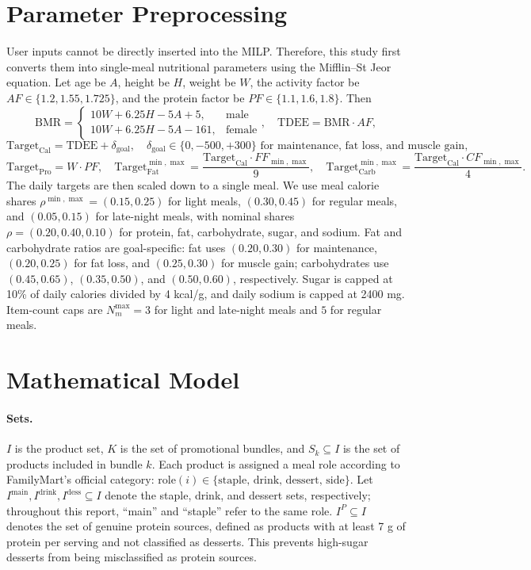 \documentclass[a4paper]{article}
\begin{document}
\section{Parameter Preprocessing}\label{sec:pre}
User inputs cannot be directly inserted into the MILP. Therefore, this study first converts them into single-meal nutritional parameters using the Mifflin--St Jeor equation. Let age be $A$, height be $H$, weight be $W$, the activity factor be $AF \in \{1.2,1.55,1.725\}$, and the protein factor be $PF \in \{1.1,1.6,1.8\}$. Then
\[
\text{BMR} = \begin{cases}10W+6.25H-5A+5, & \text{male}\\10W+6.25H-5A-161, & \text{female}\end{cases},\quad
\text{TDEE} = \text{BMR}\cdot AF,
\]
\[
\text{Target}_{\text{Cal}} = \text{TDEE} + \delta_{\text{goal}}, \quad
\delta_{\text{goal}} \in \{0, -500, +300\} \text{ for maintenance, fat loss, and muscle gain},
\]
\[
\text{Target}_{\text{Pro}} = W \cdot PF, \quad
\text{Target}_{\text{Fat}}^{\min,\max} = \frac{\text{Target}_{\text{Cal}}\cdot FF_{\min,\max}}{9},\quad
\text{Target}_{\text{Carb}}^{\min,\max} = \frac{\text{Target}_{\text{Cal}}\cdot CF_{\min,\max}}{4}.
\]
The daily targets are then scaled down to a single meal. We use meal calorie shares $\rho^{\min,\max}=(0.15,0.25)$ for light meals, $(0.30,0.45)$ for regular meals, and $(0.05,0.15)$ for late-night meals, with nominal shares $\rho=(0.20,0.40,0.10)$ for protein, fat, carbohydrate, sugar, and sodium. Fat and carbohydrate ratios are goal-specific: fat uses $(0.20,0.30)$ for maintenance, $(0.20,0.25)$ for fat loss, and $(0.25,0.30)$ for muscle gain; carbohydrates use $(0.45,0.65)$, $(0.35,0.50)$, and $(0.50,0.60)$, respectively. Sugar is capped at 10\% of daily calories divided by 4 kcal/g, and daily sodium is capped at 2400 mg. Item-count caps are $N_m^{\max}=3$ for light and late-night meals and $5$ for regular meals.

\section{Mathematical Model}\label{sec:model}
\paragraph{Sets.}$I$ is the product set, $K$ is the set of promotional bundles, and $S_k\subseteq I$ is the set of products included in bundle $k$. Each product is assigned a meal role according to FamilyMart's official category: $\mathrm{role}(i)\in\{\text{staple, drink, dessert, side}\}$. Let $I^{\mathrm{main}}, I^{\mathrm{drink}}, I^{\mathrm{dess}}\subseteq I$ denote the staple, drink, and dessert sets, respectively; throughout this report, ``main'' and ``staple'' refer to the same role. $I^P\subseteq I$ denotes the set of genuine protein sources, defined as products with at least 7 g of protein per serving and not classified as desserts. This prevents high-sugar desserts from being misclassified as protein sources.
\end{document}
